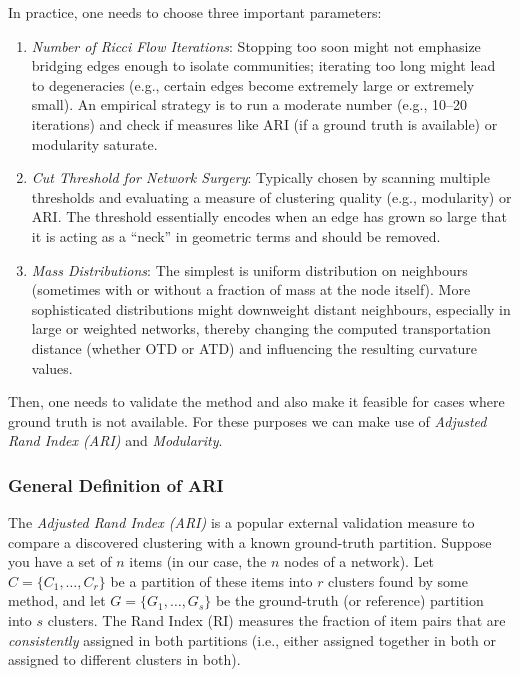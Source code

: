In practice, one needs to choose three important parameters:
\begin{enumerate}
    \item \emph{Number of Ricci Flow Iterations}: Stopping too soon might not emphasize bridging edges enough to isolate communities; iterating too long might lead to degeneracies (e.g., certain edges become extremely large or extremely small). An empirical strategy is to run a moderate number (e.g., 10--20 iterations) and check if measures like ARI (if a ground truth is available) or modularity saturate.

    \item \emph{Cut Threshold for Network Surgery}: Typically chosen by scanning multiple thresholds and evaluating a measure of clustering quality (e.g., modularity) or ARI. The threshold essentially encodes when an edge has grown so large that it is acting as a “neck” in geometric terms and should be removed.

    \item \emph{Mass Distributions}: The simplest is uniform distribution on neighbours (sometimes with or without a fraction of mass at the node itself). More sophisticated distributions might downweight distant neighbours, especially in large or weighted networks, thereby changing the computed transportation distance (whether OTD or ATD) and influencing the resulting curvature values.
\end{enumerate}

Then, one needs to validate the method and also make it feasible for cases where ground truth is not available. For these purposes we can make use of \emph{Adjusted Rand Index (ARI)} and \emph{Modularity}.

\subsubsection{General Definition of ARI}
The \emph{Adjusted Rand Index (ARI)} is a popular external validation measure to compare a discovered clustering with a known ground-truth partition. Suppose you have a set of $n$ items (in our case, the $n$ nodes of a network). Let $C = \{C_1, \ldots, C_r\}$ be a partition of these items into $r$ clusters found by some method, and let $G = \{G_1, \ldots, G_s\}$ be the ground-truth (or reference) partition into $s$ clusters. The Rand Index (RI) measures the fraction of item pairs that are \emph{consistently} assigned in both partitions (i.e., either assigned together in both or assigned to different clusters in both). 

